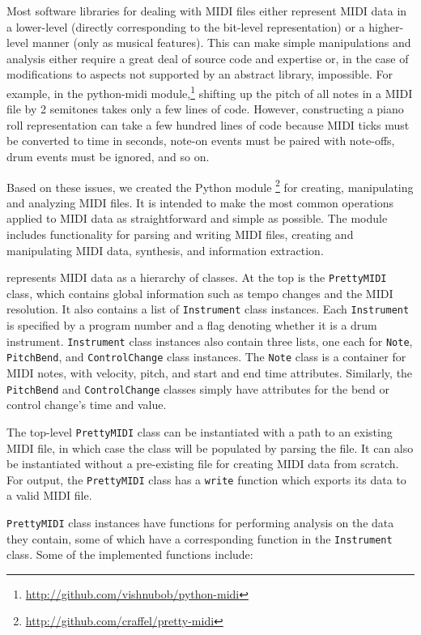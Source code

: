 Most software libraries for dealing with MIDI files either represent MIDI data in a lower-level (directly corresponding to the bit-level representation) or a higher-level manner (only as musical features).
This can make simple manipulations and analysis either require a great deal of source code and expertise or, in the case of modifications to aspects not supported by an abstract library, impossible.
For example, in the python-midi module,\footnote{\url{http://github.com/vishnubob/python-midi}} shifting up the pitch of all notes in a MIDI file by 2 semitones takes only a few lines of code.
However, constructing a piano roll representation can take a few hundred lines of code because MIDI ticks must be converted to time in seconds, note-on events must be paired with note-offs, drum events must be ignored, and so on.

Based on these issues, we created the Python module \prettymidi{}\footnote{\url{http://github.com/craffel/pretty-midi}} for creating, manipulating and analyzing MIDI files.
It is intended to make the most common operations applied to MIDI data as straightforward and simple as possible.
The module includes functionality for parsing and writing MIDI files, creating and manipulating MIDI data, synthesis, and information extraction.

\prettymidi{} represents MIDI data as a hierarchy of classes.
At the top is the \texttt{PrettyMIDI} class, which contains global information such as tempo changes and the MIDI resolution.
It also contains a list of \texttt{Instrument} class instances.
Each \texttt{Instrument} is specified by a program number and a flag denoting whether it is a drum instrument.
\texttt{Instrument} class instances also contain three lists, one each for \texttt{Note}, \texttt{PitchBend}, and \texttt{ControlChange} class instances.
The \texttt{Note} class is a container for MIDI notes, with velocity, pitch, and start and end time attributes.
Similarly, the \texttt{PitchBend} and \texttt{ControlChange} classes simply have attributes for the bend or control change's time and value.

The top-level \texttt{PrettyMIDI} class can be instantiated with a path to an existing MIDI file, in which case the class will be populated by parsing the file.
It can also be instantiated without a pre-existing file for creating MIDI data from scratch.
For output, the \texttt{PrettyMIDI} class has a \texttt{write} function which exports its data to a valid MIDI file.

\texttt{PrettyMIDI} class instances have functions for performing analysis on the data they contain, some of which have a corresponding function in the \texttt{Instrument} class.
Some of the implemented functions include:

